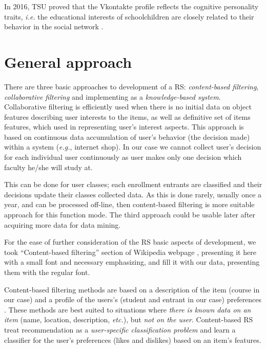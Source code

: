 \documentclass[conference]{IEEEtran}
\begin{document}
In 2016, TSU proved that the Vkontakte profile reflects the cognitive personality traits, \emph{i.e.} the educational interests of schoolchildren are closely related to their behavior in the social network \cite{c9}.


\section{General approach}

There are three basic approaches to development of a RS: \emph{content-based filtering}, \emph{collaborative filtering} and implementing as a \emph{knowledge-based system}.  Collaborative filtering is efficiently used when there is no initial data on object features describing user interests to the items, as well as definitive set of items features, which used in representing user's interest aspects.  This approach is based on continuous data accumulation of user's behavior (the decision made) within a system (\emph{e.g.}, internet shop).  In our case we cannot collect user's decision for each individual user continuously as user makes only one decision which faculty he/she will study at.

This can be done for user classes; each enrollment entrants are classified and their decisions update their classes collected data.  As this is done rarely, usually once a year, and can be processed off-line, then content-based filtering is more suitable approach for this function mode.  The third approach could be usable later after acquiring more data for data mining.


For the ease of further consideration of the RS basic aspects of development, we took ``Content-based filtering'' section of Wikipedia webpage \cite{wikiRS}, presenting it here with a small font and necessary emphasizing, and fill it with our data, presenting them with the regular font.

{\footnotesize
Content-based filtering methods are based on a description of the item (course in our case) and a profile of the users's (student and entrant in our case) preferences \cite{wb41,wb42}. These methods are best suited to situations where \emph{there is known data on an item} (name, location, description, \emph{etc.}), but \emph{not on the user}. Content-based RS treat recommendation as a \emph{user-specific classification problem} and learn a classifier for the user's preferences (likes and dislikes) based on an item's features.}
\end{document}
